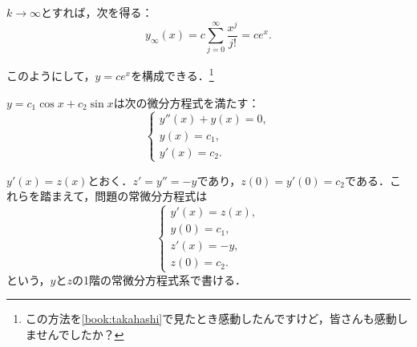 $k \to \infty$とすれば，次を得る：
\begin{equation}
    y_{\infty}(x) = c \sum_{j=0}^{\infty} \frac{x^j}{j!} = ce^x.
\end{equation}

このようにして，$y=ce^x$を構成できる．\footnote{この方法を\ref{book:takahashi}で見たとき感動したんですけど，皆さんも感動しませんでしたか？}

\begin{example}
    $y=c_1\cos x + c_2\sin x$は次の微分方程式を満たす：
    \begin{equation}
    \begin{cases}
        y''(x)+y(x) = 0, \\
        y(x) = c_1, \\
        y'(x) = c_2.
    \end{cases}
    \end{equation}

    $y'(x)=z(x)$とおく．$z'=y''=-y$であり，$z(0)=y'(0)=c_2$である．これらを踏まえて，問題の常微分方程式は
    \begin{equation}
        \begin{cases}
            y'(x)= z(x), \\
            y(0) = c_1, \\
            z'(x) = -y, \\
            z(0) = c_2.
        \end{cases}
    \end{equation}
    という，$y$と$z$の1階の常微分方程式系で書ける．


\end{example}
